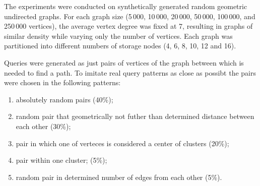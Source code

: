 The experiments were conducted on synthetically generated random geometric undirected graphs. For each graph size (5\,000, 10\,000, 20\,000, 50\,000, 100\,000, and 250\,000 vertices), the average vertex degree was fixed at 7, resulting in graphs of similar density while varying only the number of vertices. Each graph was partitioned into different numbers of storage nodes (4, 6, 8, 10, 12 and 16).

Queries were generated as just pairs of vertices of the graph between which is needed to find a path. To imitate real query patterns as close as possibt the pairs were chosen in the following patterns:

\begin{enumerate}
    \item absolutely random pairs (40\%);
    \item random pair that geometrically not futher than determined distance between each other (30\%);
    \item pair in which one of verteces is considered a center of clusters (20\%);
    \item pair within one cluster; (5\%);
    \item random pair in determined number of edges from each other (5\%).
\end{enumerate}